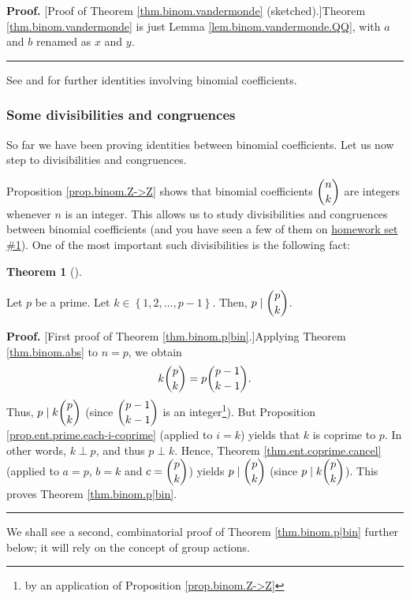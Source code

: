 \documentclass[numbers=enddot,12pt,final,onecolumn,notitlepage]{scrartcl}%
\numberwithin{exer}{subsection}
\theoremstyle{definition}
\newtheorem{theo}{Theorem}[subsection]
\newenvironment{theorem}[1][]
{\begin{theo}[#1]\begin{leftbar}}
{\end{leftbar}\end{theo}}
\newenvironment{proof}[1][Proof]{\noindent\textbf{#1.} }{\ \rule{0.5em}{0.5em}}
\newenvironment{noncompile}{}{}
\begin{document}
\begin{proof}
[Proof of Theorem \ref{thm.binom.vandermonde} (sketched).]Theorem
\ref{thm.binom.vandermonde} is just Lemma \ref{lem.binom.vandermonde.QQ}, with
$a$ and $b$ renamed as $x$ and $y$.
\end{proof}

\begin{noncompile}
See \cite{GKP} and \cite{detnotes} for further identities involving binomial coefficients.
\end{noncompile}

\subsubsection{Some divisibilities and congruences}

So far we have been proving identities between binomial coefficients. Let us
now step to divisibilities and congruences.

Proposition \ref{prop.binom.Z->Z} shows that binomial coefficients $\dbinom
{n}{k}$ are integers whenever $n$ is an integer. This allows us to study
divisibilities and congruences between binomial coefficients (and you have
seen a few of them on
\href{http://www-users.math.umn.edu/~dgrinber/19s/hw1s.pdf}{homework set
\#1}). One of the most important such divisibilities is the following fact:

\begin{theorem}
\label{thm.binom.p|bin}Let $p$ be a prime. Let $k\in\left\{  1,2,\ldots
,p-1\right\}  $. Then, $p\mid\dbinom{p}{k}$.
\end{theorem}

\begin{proof}
[First proof of Theorem \ref{thm.binom.p|bin}.]Applying Theorem
\ref{thm.binom.abs} to $n=p$, we obtain%
\[
k\dbinom{p}{k}=p\dbinom{p-1}{k-1}.
\]
Thus, $p\mid k\dbinom{p}{k}$ (since $\dbinom{p-1}{k-1}$ is an
integer\footnote{by an application of Proposition \ref{prop.binom.Z->Z}}). But
Proposition \ref{prop.ent.prime.each-i-coprime} (applied to $i=k$) yields that
$k$ is coprime to $p$. In other words, $k\perp p$, and thus $p\perp k$. Hence,
Theorem \ref{thm.ent.coprime.cancel} (applied to $a=p$, $b=k$ and
$c=\dbinom{p}{k}$) yields $p\mid\dbinom{p}{k}$ (since $p\mid k\dbinom{p}{k}$).
This proves Theorem \ref{thm.binom.p|bin}.
\end{proof}

We shall see a second, combinatorial proof of Theorem \ref{thm.binom.p|bin}
further below; it will rely on the concept of group actions.
\end{document}
